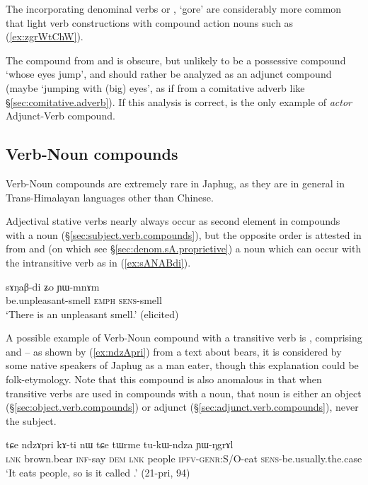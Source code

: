 The incorporating denominal verbs  or , `gore'  are considerably more common that light verb constructions with compound action nouns such as (\ref{ex:zgrWtChW}).

The compound  from  and  is obscure, but unlikely to be a possessive compound `whose eyes jump', and should rather be analyzed as an adjunct compound (maybe `jumping with (big) eyes', as if from a comitative adverb like  §\ref{sec:comitative.adverb}). If this analysis is correct,  is the only example of \textit{actor} Adjunct-Verb compound.

\subsection{Verb-Noun compounds} \label{sec.v.n.compounds}
Verb-Noun compounds are extremely rare in Japhug, as they are in general in Trans-Himalayan languages other than Chinese.  

Adjectival stative verbs nearly always occur as second element in compounds with a noun (§\ref{sec:subject.verb.compounds}), but the opposite order is attested in  from  and  (on which see §\ref{sec:denom.sA.proprietive})  a noun which can occur with the intransitive verb  as in (\ref{ex:sANABdi}).

\begin{exe}
\ex \label{ex:sANABdi}
\gll sɤŋaβ-di ʑo ɲɯ-mnɤm \\
be.unpleasant-smell \textsc{emph} \textsc{sens}-smell \\
\glt `There is an unpleasant smell.' (elicited)
\end{exe}

A possible example of Verb-Noun compound with a transitive verb is , comprising  and  -- as shown by (\ref{ex:ndzApri}) from a text about bears, it is considered by some native speakers of Japhug as a man eater, though this explanation could be folk-etymology. Note that this compound is also anomalous in that when transitive verbs are used in compounds with a noun, that noun is either an object (§\ref{sec:object.verb.compounds}) or adjunct (§\ref{sec:adjunct.verb.compounds}), never the subject.

\begin{exe}
\ex \label{ex:ndzApri}
\gll tɕe ndzɤpri kɤ-ti nɯ tɕe tɯrme tu-kɯ-ndza ɲɯ-ŋgrɤl \\
\textsc{lnk} brown.bear \textsc{inf}-say \textsc{dem} \textsc{lnk} people \textsc{ipfv}-\textsc{genr}:S/O-eat \textsc{sens}-be.usually.the.case \\
\glt `It eats people, so is it called .' (21-pri, 94)
\end{exe} 

